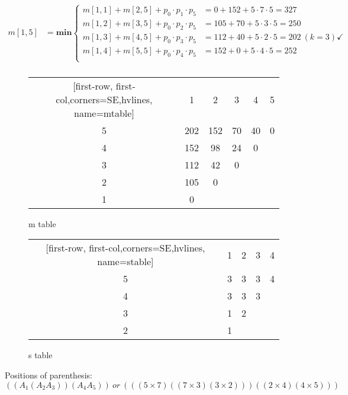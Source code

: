 \documentclass[a4paper]{article}
\makeatletter
\newenvironment{solution}
  {\begin{proof}[Solution]}
  {\end{proof}}
\renewenvironment{proof}[1][\proofname]{%
  \par\pushQED{\qed}\normalfont%
  \topsep6\p@\@plus6\p@\relax
  \trivlist\item[\hskip\labelsep\bfseries#1\@addpunct{.}]%
  \ignorespaces
}{%
  \popQED\endtrivlist\@endpefalse
}
\makeatother
\begin{document}
\begin{align*}
  m[1,5] & =\textbf{min}\left\{\begin{array}{cl}
      m[1,1] + m[2,5] + p_0\cdot p_1 \cdot p_5 &= 0 + 152 + 5\cdot 7 \cdot 5 = 327\\
      m[1,2] + m[3,5] + p_0\cdot p_2 \cdot p_5 &= 105 + 70 +5\cdot 3 \cdot 5 = 250\\
      m[1,3] + m[4,5] + p_0\cdot p_3 \cdot p_5 &= 112 + 40 +5\cdot 2 \cdot 5 = 202\ (k =3)\checkmark\\
      m[1,4] + m[5,5] + p_0\cdot p_4 \cdot p_5 &= 152 + 0 + 5\cdot 4 \cdot 5 = 252\\
  \end{array}\right. \\
\end{align*}

\begin{figure}[H]
\centering
\begin{minipage}{5cm}
\centering
{}
\begin{NiceTabular}{*{5}{c}}[first-row, first-col,corners=SE,hvlines, name=mtable]
&1&2&3&4&5\\
5&202&152&70&40&0\\
4&152&98&24&0\\
3&112&42&0\\
2&105&0\\
1&0
\end{NiceTabular}
\caption{m table}
\end{minipage}
\qquad
\begin{minipage}{5cm}
\centering
{}
\begin{NiceTabular}{*{4}{c}}[first-row, first-col,corners=SE,hvlines, name=stable]
&1&2&3&4\\
5&3&3&3&4\\
4&3&3&3\\
3&1&2\\
2&1\\
\end{NiceTabular}
\caption{s table}
\end{minipage}
\end{figure}

\begin{solution}
Positions of parenthesis: $((A_1(A_2A_3))(A_4A_5))\ or\ (((5 \times 7)((7 \times 3)(3 \times 2)))((2 \times 4)(4 \times 5)))$
\end{solution}
\end{document}
